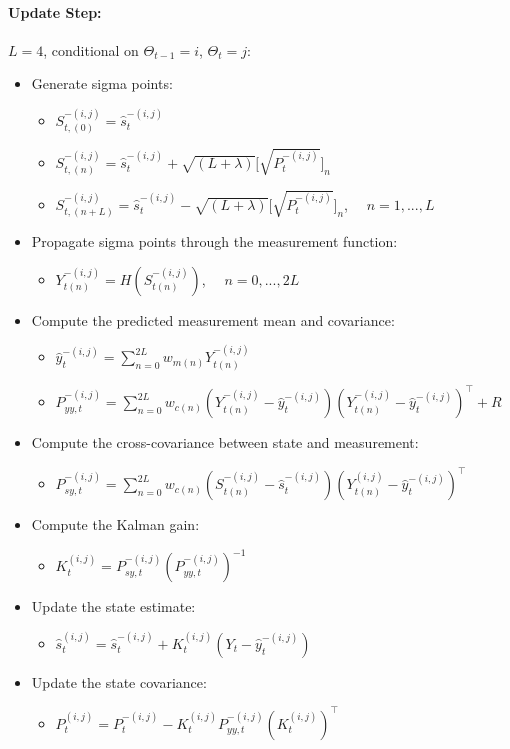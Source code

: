 \documentclass[12pt,letter,leqno]{article}
\theoremstyle{asn}
\theoremstyle{lem}
\theoremstyle{slem}
\theoremstyle{prop}
\theoremstyle{appprop}
\theoremstyle{rem}
\theoremstyle{defn}
\begin{document}
\paragraph{Update Step:}
$L=4$, conditional on $\Theta_{t-1}=i$, $\Theta_t=j$:
\begin{itemize}
\item Generate sigma points: 
\begin{itemize}
\item $S_{t,(0)}^{-(i,j)}  =\hat{s}_t^{-(i,j)}$
\item $S_{t,(n)}^{-(i,j)}  =\hat{s}_t^{-(i,j)} + \sqrt{(L+\lambda)}\big[\sqrt{P_t^{-(i,j)}}\big]_n$
\item $S_{t,(n+L)}^{-(i,j)}  =\hat{s}_t^{-(i,j)} - \sqrt{(L+\lambda)}\big[\sqrt{P_t^{-(i,j)}}\big]_n$, $\quad  n=1,...,L$
\end{itemize}

\item Propagate sigma points through the measurement function:
\begin{itemize}
\item $Y_{t(n)}^{-(i,j)} = H(S_{t(n)}^{-(i,j)})$, $\quad  n=0,...,2L$
\end{itemize}
\item Compute the predicted measurement mean and covariance:
\begin{itemize}
\item $\hat{y}_t^{-(i,j)} = \sum_{n=0}^{2L} w_{m(n)} Y_{t(n)}^{-(i,j)}$
\item $P_{yy,t}^{-(i,j)} = \sum_{n=0}^{2L} w_{c(n)} (Y_{t(n)}^{-(i,j)} - \hat{y}_t^{-(i,j)})(Y_{t(n)}^{-(i,j)} - \hat{y}_t^{-(i,j)})^\top + R$
\end{itemize}
\item Compute the cross-covariance between state and measurement:
\begin{itemize}
\item $P_{sy,t}^{-(i,j)} = \sum_{n=0}^{2L} w_{c(n)} (S_{t(n)}^{-(i,j)} - \hat{s}_t^{-(i,j)})(Y_{t(n)}^{(i,j)} - \hat{y}_t^{-(i,j)})^\top$
\end{itemize}
\item Compute the Kalman gain:
\begin{itemize}
\item $K_t^{(i,j)} = P_{sy,t}^{-(i,j)} (P_{yy,t}^{-(i,j)})^{-1}$
\end{itemize}
\item Update the state estimate:
\begin{itemize}
\item $\hat{s}_t^{(i,j)} = \hat{s}_t^{-(i,j)} + K_t^{(i,j)}(Y_t - \hat{y}_t^{-(i,j)})$
\end{itemize}
\item Update the state covariance:
\begin{itemize}
\item $P_t^{(i,j)} = P_t^{-(i,j)} - K_t^{(i,j)}P_{yy,t}^{-(i,j)}(K_t^{(i,j)})^\top$
\end{itemize}

\end{itemize}
\end{document}
